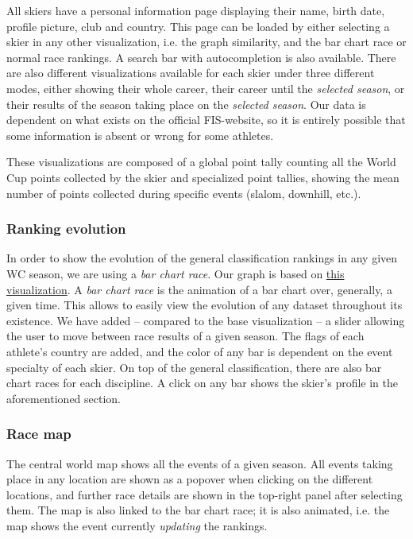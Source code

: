All skiers have a personal information page displaying their name, birth date, profile picture, club and country.
This page can be loaded by either selecting a skier in any other visualization, i.e. the graph similarity, and the bar chart race or normal race rankings.
A search bar with autocompletion is also available.
There are also different visualizations available for each skier under three different modes, either showing their whole career, their career until the \textit{selected season}, or their results of the season taking place on the \textit{selected season}.
Our data is dependent on what exists on the official FIS-website, so it is entirely possible that some information is absent or wrong for some athletes.

These visualizations are composed of a global point tally counting all the World Cup points collected by the skier and specialized point tallies, showing the mean number of points collected during specific events (slalom, downhill, etc.).

\subsubsection{Ranking evolution}

In order to show the evolution of the general classification rankings in any given WC season, we are using a \textit{bar chart race}.
Our graph is based on \href{https://bl.ocks.org/jrzief/70f1f8a5d066a286da3a1e699823470f}{this visualization}.
A \textit{bar chart race} is the animation of a bar chart over, generally, a given time.
This allows to easily view the evolution of any dataset throughout its existence.
We have added -- compared to the base visualization -- a slider allowing the user to move between race results of a given season.
The flags of each athlete's country are added, and the color of any bar is dependent on the event specialty of each skier.
On top of the general classification, there are also bar chart races for each discipline.
A click on any bar shows the skier's profile in the aforementioned section.

\subsubsection{Race map}

The central world map shows all the events of a given season.
All events taking place in any location are shown as a popover when clicking on the different locations, and further race details are shown in the top-right panel after selecting them.
The map is also linked to the bar chart race; it is also animated, i.e. the map shows the event currently \textit{updating} the rankings.

